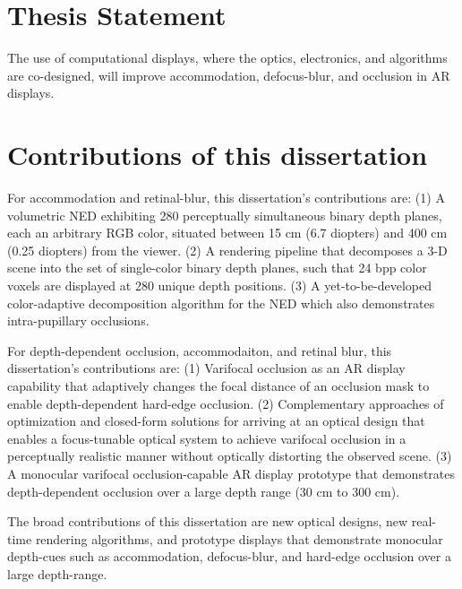\section{Thesis Statement}
The use of computational displays, where the optics, electronics, and algorithms are co-designed, will improve accommodation, defocus-blur, and occlusion in AR displays.

\section{Contributions of this dissertation}
For accommodation and retinal-blur, this dissertation’s contributions are: 
(1) A volumetric NED exhibiting 280 perceptually simultaneous binary depth planes, each an arbitrary RGB color, situated between 15 cm (6.7 diopters) and 400 cm (0.25 diopters) from the viewer. 
(2) A rendering pipeline that decomposes a 3-D scene into the set of single-color binary depth planes, such that 24 bpp color voxels are displayed at 280 unique depth positions. 
(3) A yet-to-be-developed color-adaptive decomposition algorithm for the NED which also demonstrates intra-pupillary occlusions. 

For depth-dependent occlusion, accommodaiton, and retinal blur, this dissertation’s contributions are: 
(1) Varifocal occlusion as an AR display capability that adaptively changes the focal distance of an occlusion mask to enable depth-dependent hard-edge occlusion. 
(2) Complementary approaches of optimization and closed-form solutions for arriving at an optical design that enables a focus-tunable optical system to achieve varifocal occlusion in a perceptually realistic manner without optically distorting the observed scene. 
(3) A monocular varifocal occlusion-capable AR display prototype that demonstrates depth-dependent occlusion over a large depth range (30 cm to 300 cm). 

The broad contributions of this dissertation are new optical designs, new real-time rendering algorithms, and prototype displays that demonstrate monocular depth-cues such as accommodation, defocus-blur, and hard-edge occlusion over a large depth-range. 